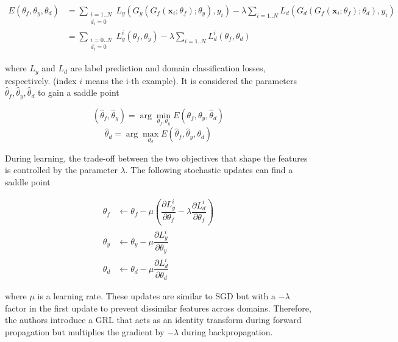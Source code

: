 \begin{equation*}
\begin{split}
E(\theta_f, \theta_y, \theta_d) & = \sum_{\substack{i=1..N \\ d_i = 0}} L_y(G_y(G_f(\textbf{x}_i; \theta_f); \theta_y), y_i) - \lambda \sum_{i = 1..N} L_d(G_d(G_f(\textbf{x}_i; \theta_f); \theta_d), y_i) \\ & = \sum_{\substack{i=0..N \\ d_i = 0}} L_y^i(\theta_f, \theta_y) - \lambda \sum_{i=1..N} L_d^i(\theta_f, \theta_d)
\end{split}
\end{equation*} 

 where $L_y$ and $L_d$ are label prediction and domain classification losses, respectively. (index $i$ means the i-th example). It is considered the parameters $\hat{\theta}_f, \hat{\theta}_y, \hat{\theta}_d$ to gain a saddle point

$$
(\hat{\theta}_f , \hat{\theta}_y ) = \arg \min_{\theta_f, \theta_y} E(\theta_f, \theta_y, \hat{\theta}_d)
$$
$$
\hat{\theta}_d = \arg \max_{\theta_d} E(\hat{\theta}_f, \hat{\theta}_y, \theta_d)
$$

During learning, the trade-off between the two objectives that shape the features is controlled by the parameter $\lambda$. The following stochastic updates can find a saddle point

\begin{equation*}
\begin{split}
\theta_f & \leftarrow \theta_f - \mu \left( \dfrac{\partial L_y^i}{\partial \theta_f} - \lambda \dfrac{\partial L_d^i}{\partial \theta_f} \right) \\ 
\theta_y & \leftarrow \theta_y - \mu \dfrac{\partial L_y^i}{\partial \theta_y} \\ 
\theta_d & \leftarrow \theta_d - \mu \dfrac{\partial L_d^i}{\partial \theta_d} 
\end{split}
\end{equation*} 

where $\mu$ is a learning rate. These updates are similar to SGD but with a $-\lambda$ factor in the first update to prevent dissimilar features across domains. Therefore, the authors introduce a GRL that acts as an identity transform during forward propagation but multiplies the gradient by $-\lambda$ during backpropagation.